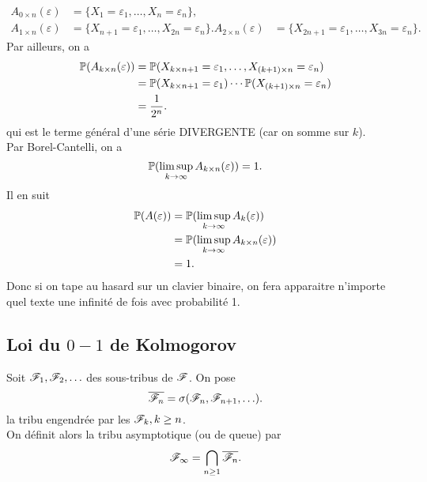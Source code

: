 \begin{example}
\begin{equation*}
        \begin{aligned}
            A_{0\times n}(\varepsilon) &= \{X_1 = \varepsilon_1,\ldots,X_n = \varepsilon_n\},\\
            A_{1\times n}(\varepsilon) &= \{X_{n+1} = \varepsilon_1,\ldots,X_{2n} = \varepsilon_n\}.
            A_{2\times n}(\varepsilon) &= \{X_{2n+1} = \varepsilon_1,\ldots,X_{3n} = \varepsilon_n\}.
        \end{aligned}
    \end{equation*}
    Par ailleurs, on a
    \begin{equation*}
        \begin{aligned}
            \mathbb{P}(A_{k\times n}(\varepsilon)) 
            &= \mathbb{P}(X_{k\times n + 1} = \varepsilon_1,\ldots,X_{(k+1)\times n} = \varepsilon_n)\\
            &= \mathbb{P}(X_{k\times n + 1} = \varepsilon_1)\cdots \mathbb{P}(X_{(k+1)\times n} = \varepsilon_n)\\
            &= \frac{1}{2^n}.
        \end{aligned}
    \end{equation*}
    qui est le terme général d'une série DIVERGENTE (car on somme sur \(k\)).\\
    Par Borel-Cantelli, on a
    \begin{equation*}
        \mathbb{P}(\limsup_{k\to\infty} A_{k\times n}(\varepsilon)) = 1.
    \end{equation*}
    Il en suit
    \begin{equation*}
        \begin{aligned}
            \mathbb{P}(A(\varepsilon))
            &= \mathbb{P}(\limsup_{k\to\infty} A_k(\varepsilon))\\
            &= \mathbb{P}(\limsup_{k\to\infty} A_{k\times n}(\varepsilon))\\
            &= 1.
        \end{aligned}
    \end{equation*}
    Donc si on tape au hasard sur un clavier binaire, on fera apparaitre n'importe
    quel texte une infinité de fois avec probabilité 1.
\end{example}

\subsection{Loi du \(0-1\) de Kolmogorov} %

Soit \(\mathscr{F}_1, \mathscr{F}_2,\ldots\) des sous-tribus de \(\mathscr{F}\). On pose
\begin{equation*}
    \overline{\mathscr{F}_n} = \sigma(\mathscr{F}_n,\mathscr{F}_{n+1},\ldots).
\end{equation*}
la tribu engendrée par les \(\mathscr{F}_k, k\geq n\).\\
On définit alors la tribu asymptotique (ou de queue) par
\begin{equation*}
    \mathscr{F}_\infty = \bigcap_{n\geq 1} \overline{\mathscr{F}_n}.
\end{equation*}

